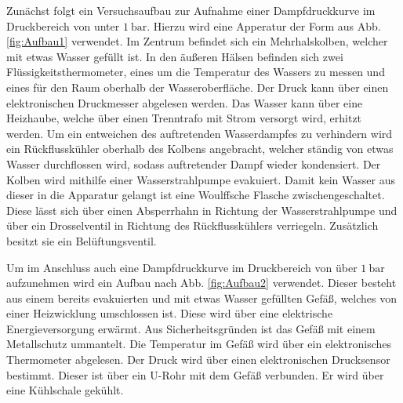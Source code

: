 Zunächst folgt ein Versuchsaufbau zur Aufnahme einer Dampfdruckkurve im Druckbereich
 von unter $\SI{1}{\bar}$. Hierzu wird eine Apperatur der Form aus Abb. \ref{fig:Aufbau1} verwendet.
   Im Zentrum befindet sich ein Mehrhalskolben, welcher mit etwas Wasser gefüllt ist.
    In den äußeren Hälsen befinden sich zwei Flüssigkeitsthermometer, eines um die
     Temperatur des Wassers zu messen und eines für den Raum oberhalb der
      Wasseroberfläche. Der Druck kann über einen elektronischen Druckmesser abgelesen werden.
       Das Wasser kann über eine Heizhaube, welche über einen
       Trenntrafo mit Strom versorgt wird, erhitzt werden. Um ein entweichen
        des auftretenden Wasserdampfes zu verhindern
         wird ein Rückflusskühler oberhalb des Kolbens angebracht, welcher
         ständig von etwas Wasser durchflossen wird, sodass auftretender Dampf
          wieder kondensiert. Der Kolben wird mithilfe einer Wasserstrahlpumpe evakuiert.
           Damit kein Wasser aus dieser in die Apparatur gelangt ist eine
            Woulffsche Flasche zwischengeschaltet. Diese lässt sich über einen
             Absperrhahn in Richtung der Wasserstrahlpumpe und über ein Drosselventil
              in Richtung des Rückflusskühlers verriegeln. Zusätzlich besitzt sie ein Belüftungsventil.

            Um im Anschluss auch eine Dampfdruckkurve im Druckbereich von über
             $\SI{1}{\bar}$ aufzunehmen wird ein Aufbau nach Abb. \ref{fig:Aufbau2} verwendet.
              Dieser besteht aus einem bereits evakuierten und mit etwas Wasser
               gefüllten Gefäß, welches von einer Heizwicklung umschlossen ist.
                Diese wird über eine elektrische Energieversorgung erwärmt. Aus
                 Sicherheitsgründen ist das Gefäß mit einem Metallschutz
                  ummantelt. Die Temperatur im Gefäß wird über ein elektronisches
                   Thermometer abgelesen. Der Druck wird über einen elektronischen
                   Drucksensor bestimmt. Dieser ist über ein U-Rohr mit dem Gefäß
                   verbunden. Er wird über eine Kühlschale gekühlt.

